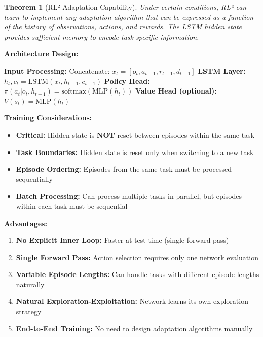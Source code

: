 \documentclass[12pt]{article}
\newcommand{\ieee}[1]{\textcolor{IEEEBlue}{\textbf{#1}}}
\newcommand{\highlight}[1]{\textcolor{IEEERed}{\textbf{#1}}}
\newtheorem{theorem}{Theorem}
\begin{document}
{{			\begin{theorem}[RL² Adaptation Capability]
			Under certain conditions, RL² can learn to implement any adaptation algorithm that can be expressed as a function of the history of observations, actions, and rewards. The LSTM hidden state provides sufficient memory to encode task-specific information.
			\end{theorem}
			
			\ieee{Architecture Design:}
			
			\begin{algorithm}[H]
			\caption{RL² Network Architecture}
			\begin{algorithmic}[1]
			\STATE \textbf{Input Processing:}
			\STATE Concatenate: $x_t = [o_t, a_{t-1}, r_{t-1}, d_{t-1}]$
			\STATE \textbf{LSTM Layer:}
			\STATE $h_t, c_t = \text{LSTM}(x_t, h_{t-1}, c_{t-1})$
			\STATE \textbf{Policy Head:}
			\STATE $\pi(a_t | o_t, h_{t-1}) = \text{softmax}(\text{MLP}(h_t))$
			\STATE \textbf{Value Head (optional):}
			\STATE $V(s_t) = \text{MLP}(h_t)$
			\end{algorithmic}
			\end{algorithm}
			
			\ieee{Training Considerations:}
			
			\begin{itemize}
				\item \textbf{Critical:} Hidden state is \highlight{NOT} reset between episodes within the same task
				\item \textbf{Task Boundaries:} Hidden state is reset only when switching to a new task
				\item \textbf{Episode Ordering:} Episodes from the same task must be processed sequentially
				\item \textbf{Batch Processing:} Can process multiple tasks in parallel, but episodes within each task must be sequential
			\end{itemize}
			
			\ieee{Advantages:}
			
			\begin{enumerate}
				\item \textbf{No Explicit Inner Loop:} Faster at test time (single forward pass)
				\item \textbf{Single Forward Pass:} Action selection requires only one network evaluation
				\item \textbf{Variable Episode Lengths:} Can handle tasks with different episode lengths naturally
				\item \textbf{Natural Exploration-Exploitation:} Network learns its own exploration strategy
				\item \textbf{End-to-End Training:} No need to design adaptation algorithms manually
			\end{enumerate}
			
}}
\end{document}
